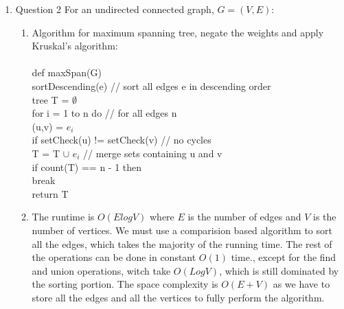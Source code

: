 \documentclass{article}
\newcommand\tab[1][1cm]{\hspace*{#1}}
\begin{document}
\begin{enumerate}
  \item Question 2
    For an undirected connected graph, $G=(V,E)$:\\
    \begin{enumerate}
    \item Algorithm for maximum spanning tree, negate the weights
      and apply Kruskal's algorithm:\\\\
      def maxSpan(G)\\
      \tab sortDescending(e) // sort all edges e in descending order\\
      \tab tree T = $\emptyset$\\
      \tab for i = 1 to n do // for all edges n\\
      \tab \tab (u,v) = $e_{i}$\\
      \tab \tab if setCheck(u) != setCheck(v) // no cycles\\
      \tab \tab \tab T = T $\cup$ {$e_{i}$} // merge sets containing u and v\\
      \tab \tab \tab if count(T) == n - 1 then\\
      \tab \tab \tab \tab break\\
      \tab return T

    \item The runtime is $O(E log V)$ where $E$ is the number of edges and $V$ is the number of
      vertices. We must use a comparision based algorithm to sort all the edges, which takes the majority
        of the running time. The rest of the operations can be done in constant $O(1)$ time., except
        for the find and union operations, witch take $O(Log V)$, which is still dominated by the
        sorting portion. The space complexity is $O(E + V)$ as we have to store all the edges and
        all the vertices to fully perform the algorithm.

    \end{enumerate}
      

\end{enumerate}
\end{document}
